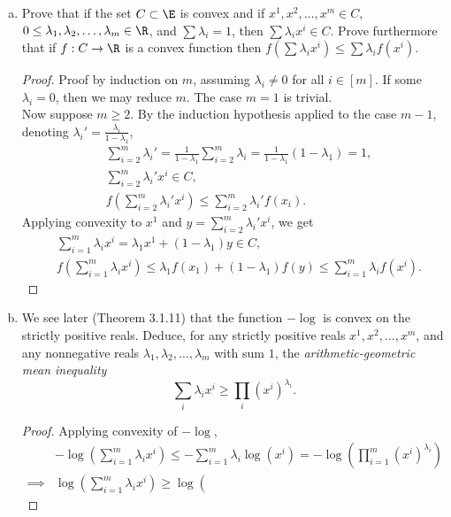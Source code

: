 \documentclass[12pt, letterpaper]{article}
\numberwithin{equation}{subsection}
\begin{document}
\begin{enumerate}[(a)]
\item Prove that if the set $C\subset \E$ is convex and if $x^1,x^2,
\ldots, x^m\in C$, $0\leq \lambda_1,\lambda_2,\ldots, \lambda_m\in\R$,
and $\sum \lambda_i=1$, then $\sum \lambda_i x^i\in C$. Prove furthermore 
that if $f:C\to\R$ is a convex function then $f\left(\sum \lambda_ix^i
\right)\leq \sum\lambda_i f(x^i)$. 
\begin{proof}
Proof by induction on $m$, assuming $\lambda_i\neq 0$ for all $i\in[m]$.
If some $\lambda_i=0$, then we may reduce $m$. The case $m=1$ is trivial.\\
Now suppose $m\geq 2$. By the induction hypothesis applied to the case 
$m-1$, denoting $\lambda_i' = \frac{\lambda_i}{1-\lambda_1}$, 
\begin{align*}
& \sum_{i=2}^m \lambda_i' = \frac{1}{1-\lambda_1}\sum_{i=2}^m \lambda_i 
= \frac{1}{1-\lambda_1}\left(1-\lambda_1\right) = 1, \\
& \sum_{i=2}^m \lambda_i' x^i \in C, \\
& f\left(\sum_{i=2}^m \lambda_i' x^i \right) \leq \sum_{i=2}^m \lambda_i'
f(x_i).
\end{align*}
Applying convexity to $x^1$ and $y=\sum_{i=2}^m \lambda_i' x^i$, we get 
\begin{align*}
& \sum_{i=1}^m \lambda_i x^i = \lambda_1 x^1 + (1-\lambda_1)y \in C,\\
& f\left(\sum_{i=1}^m \lambda_i x^i\right) \leq \lambda_1 f(x_1) 
+ (1-\lambda_1)f(y) \leq \sum_{i=1}^m \lambda_i f(x^i).
\end{align*}
\end{proof}
\item We see later (Theorem 3.1.11) that the function $-\log$ is 
convex on the strictly positive reals. Deduce, for any strictly 
positive reals $x^1,x^2,\ldots, x^m$, and any nonnegative reals 
$\lambda_1,\lambda_2,\ldots,\lambda_m$ with sum $1$, the 
\textit{arithmetic-geometric mean inequality}
\begin{equation*}
\sum_i \lambda_ix^i \geq \prod_i (x^i)^{\lambda_i}.  
\end{equation*}
\begin{proof}
Applying convexity of $-\log$,
\begin{align*}
& -\log\left(\sum_{i=1}^m \lambda_i x^i \right) \leq -\sum_{i=1}^m 
\lambda_i \log(x^i) = -\log\left(\prod_{i=1}^m (x^i)^{\lambda_i}\right)\\
\implies & \log\left(\sum_{i=1}^m \lambda_ix^i\right) \geq \log\left(

\end{align*}
\end{proof}
\end{enumerate}
\end{document}
